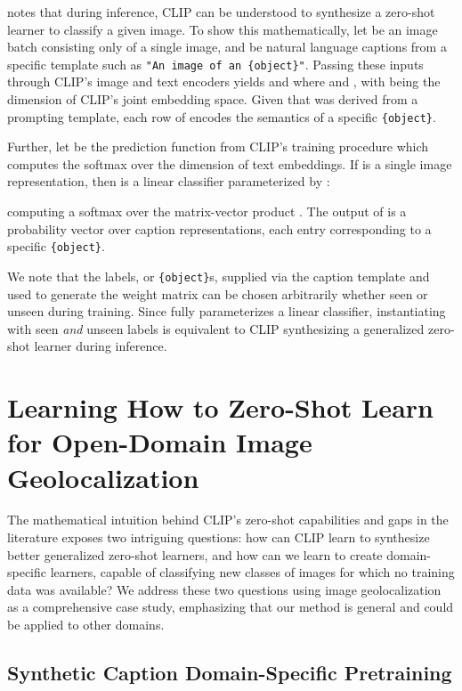 \documentclass{article}
\begin{document}
\citet{radford21a} notes that during inference, CLIP can be understood to synthesize a zero-shot learner to classify a given image. To show this mathematically, let  be an image batch consisting only of a single image, and  be  natural language captions from a specific template such as \texttt{"An image of an \{object\}"}. Passing these inputs through CLIP's image and text encoders yields  and  where  and , with  being the dimension of CLIP's joint embedding space. Given that  was derived from a prompting template, each row of  encodes the semantics of a specific \texttt{\{object\}}. 

Further, let  be the prediction function from CLIP's training procedure which computes the softmax over the dimension of text embeddings. If  is a single image representation, then  is a linear classifier parameterized by : 



computing a softmax over the matrix-vector product . The output of  is a probability vector over caption representations, each entry corresponding to a specific \texttt{\{object\}}.

We note that the labels, or \texttt{\{object\}}s, supplied via the caption template and used to generate the weight matrix  can be chosen arbitrarily whether seen or unseen during training. Since  fully parameterizes a linear classifier, instantiating  with seen \emph{and} unseen labels is equivalent to CLIP synthesizing a generalized zero-shot learner during inference. 

\section{Learning How to Zero-Shot Learn for Open-Domain Image Geolocalization}

The mathematical intuition behind CLIP's zero-shot capabilities and gaps in the literature exposes two intriguing questions: how can CLIP learn to synthesize better generalized zero-shot learners, and how can we learn to create domain-specific learners, capable of classifying new classes of images for which no training data was available? We address these two questions using image geolocalization as a comprehensive case study, emphasizing that our method is general and could be applied to other domains.

\subsection{Synthetic Caption Domain-Specific Pretraining}
\label{sec:scdp}
\end{document}
